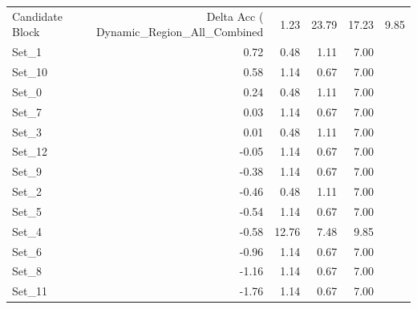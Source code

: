 \begin{tabular}{lrrrr}
\toprule
Candidate Block & Delta Acc (%
\midrule
Dynamic_Region_All_Combined & 1.23 & 23.79 & 17.23 & 9.85 \\
Set_1 & 0.72 & 0.48 & 1.11 & 7.00 \\
Set_10 & 0.58 & 1.14 & 0.67 & 7.00 \\
Set_0 & 0.24 & 0.48 & 1.11 & 7.00 \\
Set_7 & 0.03 & 1.14 & 0.67 & 7.00 \\
Set_3 & 0.01 & 0.48 & 1.11 & 7.00 \\
Set_12 & -0.05 & 1.14 & 0.67 & 7.00 \\
Set_9 & -0.38 & 1.14 & 0.67 & 7.00 \\
Set_2 & -0.46 & 0.48 & 1.11 & 7.00 \\
Set_5 & -0.54 & 1.14 & 0.67 & 7.00 \\
Set_4 & -0.58 & 12.76 & 7.48 & 9.85 \\
Set_6 & -0.96 & 1.14 & 0.67 & 7.00 \\
Set_8 & -1.16 & 1.14 & 0.67 & 7.00 \\
Set_11 & -1.76 & 1.14 & 0.67 & 7.00 \\
\bottomrule
\end{tabular}
